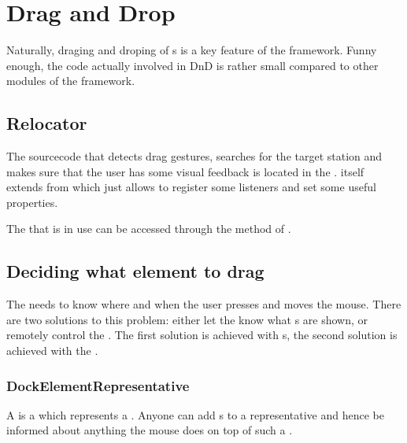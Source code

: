 \section{Drag and Drop}
Naturally, draging and droping of s is a key feature of the framework. Funny enough, the code actually involved in DnD is rather small compared to other modules of the framework.

\subsection{Relocator}
The sourcecode that detects drag gestures, searches for the target station and makes sure that the user has some visual feedback is located in the \linebreak {}.  itself extends from \linebreak {} which just allows to register some listeners and set some useful properties.


The  that is in use can be accessed through the method  of .

\subsection{Deciding what element to drag}
The  needs to know where and when the user presses and moves the mouse. There are two solutions to this problem: either let the  know what s are shown, or remotely control the . The first solution is achieved with s, the second solution is achieved with the .

\subsubsection{DockElementRepresentative}
A  is a  which represents a . Anyone can add s to a representative and hence be informed about anything the mouse does on top of such a .

